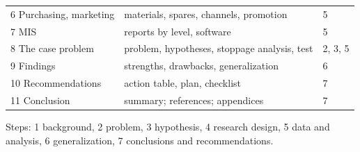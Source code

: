 {{\begin{tabularx}{\linewidth}{@{}L{2.3cm}XL{0.95cm}@{}}
6 Purchasing, marketing & materials, spares, channels, promotion & 5 \\
7 MIS & reports by level, software & 5 \\
8 The case problem & problem, hypotheses, stoppage analysis, test & 2, 3, 5 \\
9 Findings & strengths, drawbacks, generalization & 6 \\
10 Recommendations & action table, plan, checklist & 7 \\
11 Conclusion & summary; references; appendices & 7 \\
\bottomrule
\end{tabularx}}
{\footnotesize\color{sub} Steps: 1 background, 2 problem, 3 hypothesis, 4 research design,
5 data and analysis, 6 generalization, 7 conclusions and recommendations.\par}}

